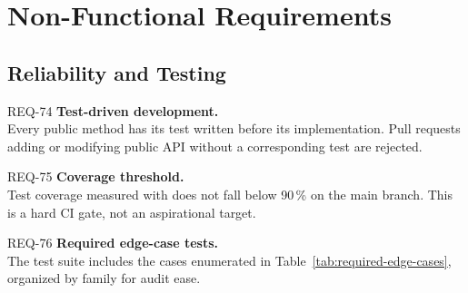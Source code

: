 
\chapter{Non-Functional Requirements}
\label{ch:nonfunctional}

\section{Reliability and Testing}

\begin{reqbox}{REQ-74}{\stable}
\textbf{Test-driven development.}\\
Every public method has its test written before its implementation. Pull
requests adding or modifying public API without a corresponding test are
rejected.
\end{reqbox}

\begin{reqbox}{REQ-75}{\stable}
\textbf{Coverage threshold.}\\
Test coverage measured with  does not fall below 90\,\%
on the main branch. This is a hard CI gate, not an aspirational target.
\end{reqbox}

\begin{reqbox}{REQ-76}{\stable}
\textbf{Required edge-case tests.}\\
The test suite includes the cases enumerated in
Table~\ref{tab:required-edge-cases}, organized by family for audit ease.
\end{reqbox}

